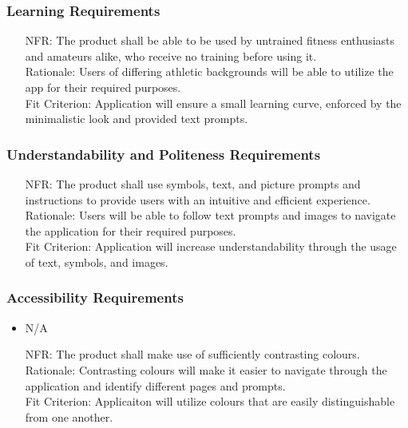 \documentclass[12pt]{article}
\newcounter{nfrnum} %
\begin{document}
\subsubsection{Learning Requirements}
\noindent \begin{itemize}
	\item[NFR\refstepcounter{nfrnum}\thenfrnum:]
	The product shall be able to be used by untrained fitness enthusiasts and amateurs alike, who receive no training before using it.
	\\ Rationale: Users of differing athletic backgrounds will be able to utilize the app for their required purposes.
	\\ Fit Criterion: Application will ensure a small learning curve, enforced by the minimalistic look and provided text prompts.
\end{itemize}
\subsubsection{Understandability and Politeness Requirements}
\noindent \begin{itemize}
	\item[NFR\refstepcounter{nfrnum}\thenfrnum:]
	The product shall use symbols, text, and picture prompts and instructions to provide users with an intuitive and efficient experience.
	\\ Rationale: Users will be able to follow text prompts and images to navigate the application for their required purposes. 
	\\ Fit Criterion: Application will increase understandability through the usage of text, symbols, and images.
\end{itemize}
\subsubsection{Accessibility Requirements}
\noindent \begin{itemize}
	\item N/A
\end{itemize}
\noindent \begin{itemize}
	\item[NFR\refstepcounter{nfrnum}\thenfrnum:]
	The product shall make use of sufficiently contrasting colours.
	\\ Rationale: Contrasting colours will make it easier to navigate through the application and identify different pages and prompts.
	\\ Fit Criterion: Applicaiton will utilize colours that are easily distinguishable from one another.
\end{itemize}
\end{document}

